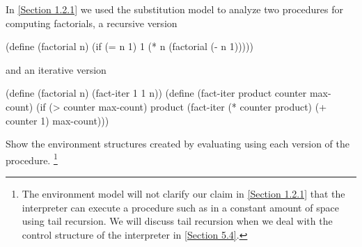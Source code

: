 \begin{exercise}
	\label{Exercise 3.9}
	In \cref{Section 1.2.1} we used the substitution model to analyze two procedures for computing factorials, a recursive version
	\begin{scheme}
	  (define (factorial n)
	    (if (= n 1) 1 (* n (factorial (- n 1)))))
	\end{scheme}
	and an iterative version
	\begin{scheme}
	  (define (factorial n) (fact-iter 1 1 n))
	  (define (fact-iter product counter max-count)
	    (if (> counter max-count)
	        product
	        (fact-iter (* counter product)
	                   (+ counter 1)
	                   max-count)))
	\end{scheme}
	Show the environment structures created by evaluating  using each version of the  procedure.%
	\footnote{
		The environment model will not clarify our claim in \cref{Section 1.2.1} that the interpreter can execute a procedure such as  in a constant amount of space using tail recursion.
		We will discuss tail recursion when we deal with the control structure of the interpreter in \cref{Section 5.4}.
	}
\end{exercise}
